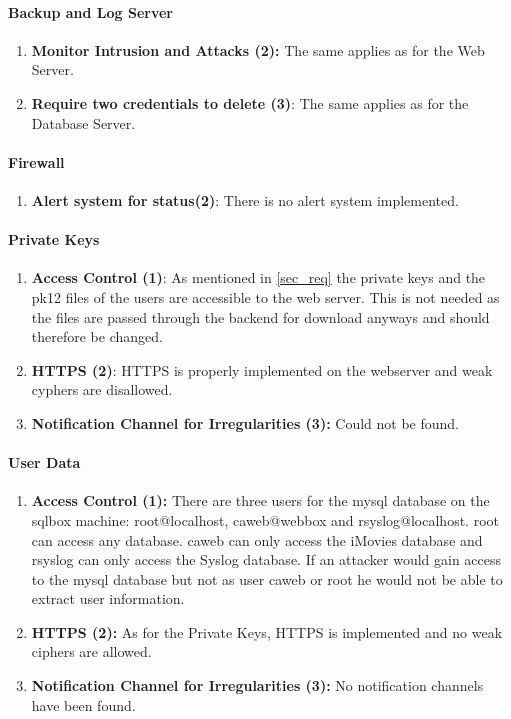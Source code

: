 \documentclass[english]{article}
\begin{document}
\paragraph{Backup and Log Server}
\begin{enumerate}[label=(\alph*)]
	\item \textbf{Monitor Intrusion and Attacks (2):} The same applies as for the Web Server.
	\item \textbf{Require two credentials to delete (3)}: The same applies as for the Database Server.
\end{enumerate} 

\paragraph{Firewall}   
\begin{enumerate}[label=(\alph*)] 
	\item \textbf{Alert system for status(2)}: There is no alert system implemented.
\end{enumerate}

\paragraph{Private Keys}
\begin{enumerate}[label=(\alph*)]
\item \textbf{Access Control (1)}: As mentioned in \ref{sec_req} the private keys and the pk12 files of the users are accessible to the web server. This is not needed as the files are passed through the backend for download anyways and should therefore be changed.
\item \textbf{HTTPS (2)}: HTTPS is properly implemented on the webserver and weak cyphers are disallowed.
\item \textbf{Notification Channel for Irregularities (3):} Could not be found.
\end{enumerate} 

\paragraph{User Data}
\begin{enumerate}[label=(\alph*)]
\item \textbf{Access Control (1):} There are three users for the mysql database on the sqlbox machine: root@localhost, caweb@webbox and rsyslog@localhost. root can access any database. caweb can only access the iMovies database and rsyslog can only access the Syslog database. If an attacker would gain access to the mysql database but not as user caweb or root he would not be able to extract user information.
\item \textbf{HTTPS (2):} As for the Private Keys, HTTPS is implemented and no weak ciphers are allowed.
\item \textbf{Notification Channel for Irregularities (3):} No notification channels have been found.
\end{enumerate}
\end{document}
